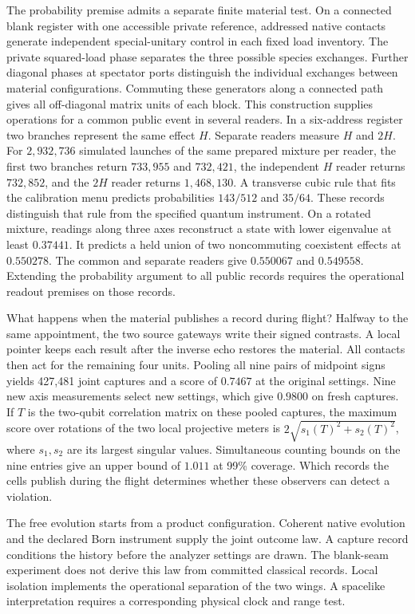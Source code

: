 \documentclass[11pt]{article}
\theoremstyle{definition}
\theoremstyle{remark}
\theoremstyle{plain}
\begin{document}
The probability premise admits a separate finite material test. On a
connected blank register with one accessible private reference,
addressed native contacts generate independent special-unitary
control in each fixed load inventory. The private squared-load phase
separates the three possible species exchanges. Further diagonal
phases at spectator ports distinguish the individual exchanges
between material configurations. Commuting these generators along a
connected path gives all off-diagonal matrix units of each block.
This construction supplies operations for a common public event in
several readers. In a six-address register two branches represent
the same effect $H$. Separate readers measure $H$ and $2H$.
For $2{,}932{,}736$ simulated launches of the same prepared mixture
per reader, the first two branches return $733{,}955$ and $732{,}421$,
the independent $H$ reader returns $732{,}852$, and the $2H$ reader
returns $1{,}468{,}130$. A transverse cubic rule that fits the calibration menu predicts
probabilities $143/512$ and $35/64$.
These records distinguish that rule from the specified quantum
instrument. On a rotated mixture, readings along three axes reconstruct
a state with lower eigenvalue at least $0.37441$. It predicts a held
union of two noncommuting coexistent effects at $0.550278$. The
common and separate readers give $0.550067$ and $0.549558$.
Extending the probability argument to all public records
requires the operational readout premises on those records.

What happens when the material publishes a record during flight?
Halfway to the same appointment, the two source gateways write their
signed contrasts. A local pointer keeps each result after the inverse
echo restores the material. All contacts then act for the remaining
four units. Pooling all nine pairs of midpoint signs yields 427,481
joint captures and a score of $0.7467$ at the original settings.
Nine new axis measurements select new settings, which give $0.9800$
on fresh captures. If $T$ is the two-qubit correlation matrix on
these pooled captures, the maximum score over rotations of the two
local projective meters is $2\sqrt{s_1(T)^2+s_2(T)^2}$, where $s_1,s_2$
are its largest singular values. Simultaneous counting bounds on the
nine entries give an upper bound of $1.011$ at 99\% coverage. Which
records the cells publish during the flight determines whether these
observers can detect a violation.

The free evolution starts from a product configuration. Coherent native
evolution and the declared Born instrument supply the joint outcome
law. A capture record conditions the history before the analyzer
settings are drawn. The blank-seam experiment does not derive this law
from committed classical records. Local isolation implements
the operational separation of the two wings. A spacelike
interpretation requires a corresponding physical clock and range test.
\end{document}
